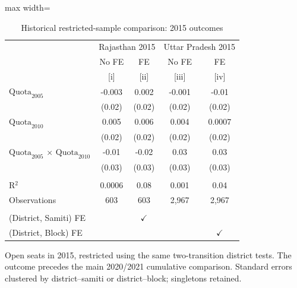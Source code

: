 
\begin{table}[htbp]
   \centering
   \scriptsize
   \begin{adjustbox}{max width=\linewidth}
      \begin{threeparttable}[b]
         \caption{\label{tab:long_term_restricted_2015} Historical restricted-sample comparison: 2015 outcomes}
         \bigskip
         \begin{tabular}{lcccc}
            \toprule
             & \multicolumn{2}{c}{Rajasthan 2015} & \multicolumn{2}{c}{Uttar Pradesh 2015} \\ 
                                                                    & No FE  & FE            & No FE  & FE \\   
                                                                    & [i]    & [ii]          & [iii]  & [iv]\\  
            \midrule 
            $\text{Quota}_{2005}$                                   & -0.003 & 0.002         & -0.001 & -0.01\\   
                                                                    & (0.02) & (0.02)        & (0.02) & (0.02)\\   
            $\text{Quota}_{2010}$                                   & 0.005  & 0.006         & 0.004  & 0.0007\\   
                                                                    & (0.02) & (0.02)        & (0.02) & (0.02)\\   
            $\text{Quota}_{2005}$ $\times$ $\text{Quota}_{2010}$    & -0.01  & -0.02         & 0.03   & 0.03\\   
                                                                    & (0.03) & (0.03)        & (0.03) & (0.03)\\   
             \\
            R$^2$                                                   & 0.0006 & 0.08          & 0.001  & 0.04\\  
            Observations                                            & 603    & 603           & 2,967  & 2,967\\  
             \\
            (District, Samiti) FE                                   &        & $\checkmark$  &        & \\  
            (District, Block) FE                                    &        &               &        & $\checkmark$\\   
            \bottomrule
         \end{tabular}
         
         \begin{tablenotes}
            \item Open seats in 2015, restricted using the same two-transition district tests. The outcome precedes the main 2020/2021 cumulative comparison. Standard errors clustered by district--samiti or district--block; singletons retained.
         \end{tablenotes}
      \end{threeparttable}
   \end{adjustbox}
\end{table}


